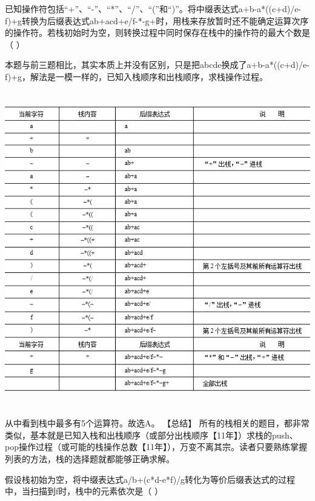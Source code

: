 \question 已知操作符包括``+''、``-''、``*''、``/''、``(''和``)''。将中缀表达式a+b-a*((c+d)/e-f)+g转换为后缀表达式ab+acd+e/f-*-g+时，用栈来存放暂时还不能确定运算次序的操作符。若栈初始时为空，则转换过程中同时保存在栈中的操作符的最大个数是（
）
\par{}
\begin{solution}本题与前三题相比，其实本质上并没有区别，只是把abcde换成了a+b-a*((c+d)/e-f)+g，解法是一模一样的，已知入栈顺序和出栈顺序，求栈操作过程。
\includegraphics[width=6.11458in,height=5.69792in]{computerassets/c09de64f3ac4b9db2f1a5f93be5d10e5.jpeg}
从中看到栈中最多有5个运算符。故选A。 【总结】
所有的栈相关的题目，都非常类似，基本就是已知入栈和出栈顺序（或部分出栈顺序【11年】）求栈的push、pop操作过程（或可能的栈操作总数【11年】），万变不离其宗。读者只要熟练掌握列表的方法，栈的选择题就都能够正确求解。
\end{solution}
\question 假设栈初始为空，将中缀表达式a/b+(c*d-e*f)/g转化为等价后缀表达式的过程中，当扫描到f时，栈中的元素依次是（
）
\par\twoch{+(*-}{\textcolor{red}{+(-*}}{/+(*-*}{/+-*}
